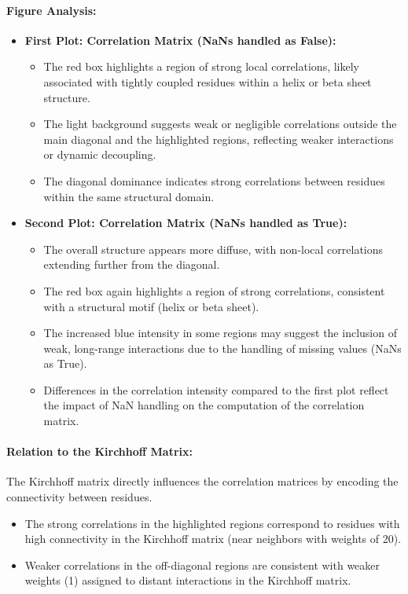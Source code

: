 \documentclass[English, Lau, oneside]{sapthesis}
\begin{document}
\paragraph{Figure Analysis:}
\begin{itemize}
    \item \textbf{First Plot: Correlation Matrix (NaNs handled as False):}
    \begin{itemize}
        \item The red box highlights a region of strong local correlations, likely associated with tightly coupled residues within a helix or beta sheet structure.
        \item The light background suggests weak or negligible correlations outside the main diagonal and the highlighted regions, reflecting weaker interactions or dynamic decoupling.
        \item The diagonal dominance indicates strong correlations between residues within the same structural domain.
    \end{itemize}

    \item \textbf{Second Plot: Correlation Matrix (NaNs handled as True):}
    \begin{itemize}
        \item The overall structure appears more diffuse, with non-local correlations extending further from the diagonal.
        \item The red box again highlights a region of strong correlations, consistent with a structural motif (helix or beta sheet).
        \item The increased blue intensity in some regions may suggest the inclusion of weak, long-range interactions due to the handling of missing values (NaNs as True).
        \item Differences in the correlation intensity compared to the first plot reflect the impact of NaN handling on the computation of the correlation matrix.
    \end{itemize}
\end{itemize}

\paragraph{Relation to the Kirchhoff Matrix:}
The Kirchhoff matrix directly influences the correlation matrices by encoding the connectivity between residues. 
\begin{itemize}
    \item The strong correlations in the highlighted regions correspond to residues with high connectivity in the Kirchhoff matrix (near neighbors with weights of 20).
    \item Weaker correlations in the off-diagonal regions are consistent with weaker weights (1) assigned to distant interactions in the Kirchhoff matrix.
\end{itemize}
\end{document}

